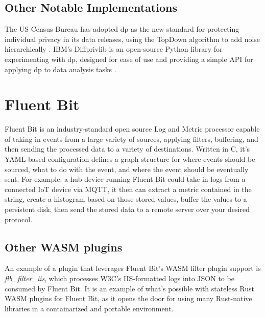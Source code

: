 \subsection{Other Notable Implementations}
The US Census Bureau has adopted \acrshort{dp} as the new standard for protecting individual privacy in its data releases, using the TopDown algorithm to add noise hierarchically \cite{Gong2022Harnessing}. IBM's Diffprivlib is an open-source Python library for experimenting with \acrshort{dp}, designed for ease of use and providing a simple API for applying \acrshort{dp} to data analysis tasks \cite{holohan2019diffprivlib}.


\section{Fluent Bit}
Fluent Bit is an industry-standard open source Log and Metric processor capable of taking in events from a large variety of sources, applying filters, buffering, and then sending the processed data to a variety of destinations.\cite{What-is-Fluent-Bit} Written in C, it's YAML-based configuration defines a graph structure for where events should be sourced, what to do with the event, and where the event should be eventually sent. For example: a hub device running Fluent Bit could take in logs from a connected IoT device via MQTT, it then can extract a metric contained in the string, create a histogram based on those stored values, buffer the values to a persistent disk, then send the stored data to a remote server over your desired protocol.
\subsection{Other WASM plugins}
An example of a plugin that leverages Fluent Bit's WASM filter plugin support is \textit{flb\_filter\_iis}\cite{Ortega}, which processes W3C's IIS-formatted logs into JSON to be consumed by Fluent Bit. It is an example of what's possible with stateless Rust WASM plugins for Fluent Bit, as it opens the door for using many Rust-native libraries in a containarized and portable environment. 